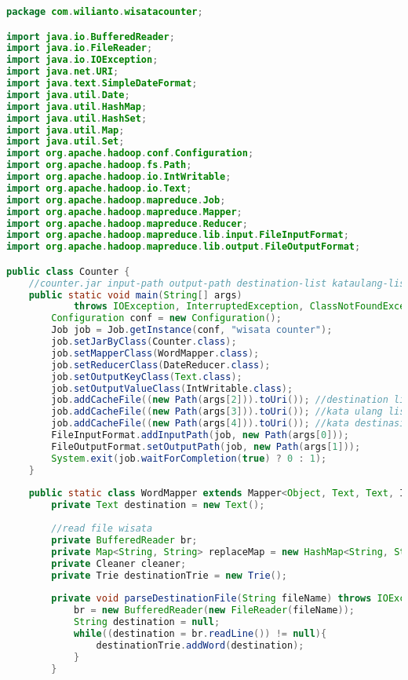 \begin{lstlisting}[language=Java,basicstyle=\tiny,caption=Counter.java (MapReduce)]
package com.wilianto.wisatacounter;

import java.io.BufferedReader;
import java.io.FileReader;
import java.io.IOException;
import java.net.URI;
import java.text.SimpleDateFormat;
import java.util.Date;
import java.util.HashMap;
import java.util.HashSet;
import java.util.Map;
import java.util.Set;
import org.apache.hadoop.conf.Configuration;
import org.apache.hadoop.fs.Path;
import org.apache.hadoop.io.IntWritable;
import org.apache.hadoop.io.Text;
import org.apache.hadoop.mapreduce.Job;
import org.apache.hadoop.mapreduce.Mapper;
import org.apache.hadoop.mapreduce.Reducer;
import org.apache.hadoop.mapreduce.lib.input.FileInputFormat;
import org.apache.hadoop.mapreduce.lib.output.FileOutputFormat;

public class Counter {
    //counter.jar input-path output-path destination-list kataulang-list destination-alias-list
    public static void main(String[] args) 
            throws IOException, InterruptedException, ClassNotFoundException {
        Configuration conf = new Configuration();
        Job job = Job.getInstance(conf, "wisata counter");
        job.setJarByClass(Counter.class);
        job.setMapperClass(WordMapper.class);
        job.setReducerClass(DateReducer.class);
        job.setOutputKeyClass(Text.class);
        job.setOutputValueClass(IntWritable.class);
        job.addCacheFile((new Path(args[2])).toUri()); //destination list
        job.addCacheFile((new Path(args[3])).toUri()); //kata ulang list
        job.addCacheFile((new Path(args[4])).toUri()); //kata destinasi alias list
        FileInputFormat.addInputPath(job, new Path(args[0]));
        FileOutputFormat.setOutputPath(job, new Path(args[1]));
        System.exit(job.waitForCompletion(true) ? 0 : 1);
    }
    
    public static class WordMapper extends Mapper<Object, Text, Text, IntWritable>{
        private Text destination = new Text();
        
        //read file wisata
        private BufferedReader br;
        private Map<String, String> replaceMap = new HashMap<String, String>();
        private Cleaner cleaner;
        private Trie destinationTrie = new Trie();
        
        private void parseDestinationFile(String fileName) throws IOException{
            br = new BufferedReader(new FileReader(fileName));
            String destination = null;
            while((destination = br.readLine()) != null){
                destinationTrie.addWord(destination);
            }
        }
        

\end{lstlisting}
